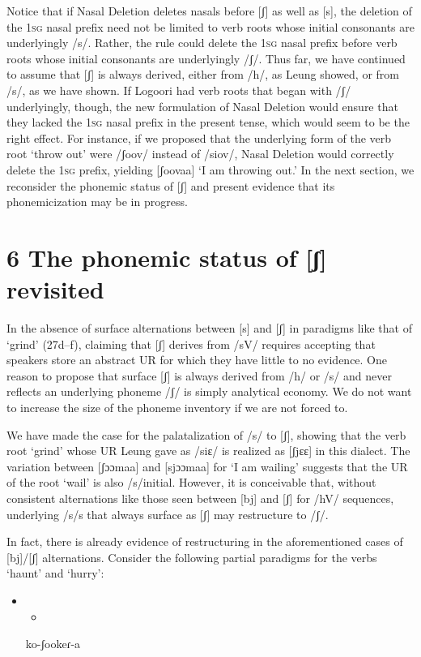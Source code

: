 \documentclass[output=paper]{langsci/langscibook}
\begin{document}
Notice that if Nasal Deletion deletes nasals before [ʃ] as well as [s], the deletion of the 1\textsc{sg} nasal prefix need not be limited to verb roots whose initial consonants are underlyingly /s/. Rather, the rule could delete the 1\textsc{sg} nasal prefix before verb roots whose initial consonants are underlyingly /ʃ/. Thus far, we have continued to assume that [ʃ] is always derived, either from /h/, as Leung showed, or from /s/, as we have shown. If Logoori had verb roots that began with /ʃ/ underlyingly, though, the new formulation of Nasal Deletion would ensure that they lacked the 1\textsc{sg} nasal prefix in the present tense, which would seem to be the right effect. For instance, if we proposed that the underlying form of the verb root ‘throw out’ were /ʃoov/ instead of /siov/, Nasal Deletion would correctly delete the 1\textsc{sg} prefix, yielding [ʃoovaa] ‘I am throwing out.’ In the next section, we reconsider the phonemic status of [ʃ] and present evidence that its phonemicization may be in progress.

\chapter{6 The phonemic status of [ʃ] revisited}

In the absence of surface alternations between [s] and [ʃ] in paradigms like that of ‘grind’ (27d–f), claiming that [ʃ] derives from /sV/ requires accepting that speakers store an abstract UR for which they have little to no evidence. One reason to propose that surface [ʃ] is always derived from /h/ or /s/ and never reflects an underlying phoneme /ʃ/ is simply analytical economy. We do not want to increase the size of the phoneme inventory if we are not forced to.

We have made the case for the palatalization of /s/ to [ʃ], showing that the verb root ‘grind’ whose UR Leung gave as /siɛ/ is realized as [ʃjɛɛ] in this dialect. The variation between [ʃɔɔmaa] and [sjɔɔmaa] for ‘I am wailing’ suggests that the UR of the root ‘wail’ is also /s/initial. However, it is conceivable that, without consistent alternations like those seen between [bj] and [ʃ] for /hV/ sequences, underlying /s/s that always surface as [ʃ] may restructure to /ʃ/. 

In fact, there is already evidence of restructuring in the aforementioned cases of [bj]/[ʃ] alternations. Consider the following partial paradigms for the verbs ‘haunt’ and ‘hurry’:

\setcounter{itemize}{0}
\begin{itemize}
\item \setcounter{itemize}{0}
\begin{itemize}
\item \end{itemize}
\end{itemize}
\setcounter{itemize}{0}
\begin{itemize}
\item [ko-ʃookeɾ-a]

\end{itemize}
\end{document}
